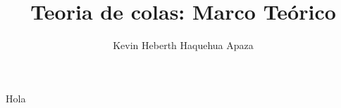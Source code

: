 \documentclass{book}
\title{Teoria de colas: Marco Teórico}
\author{Kevin Heberth Haquehua Apaza}
\begin{document}
	
	Hola
\end{document}
